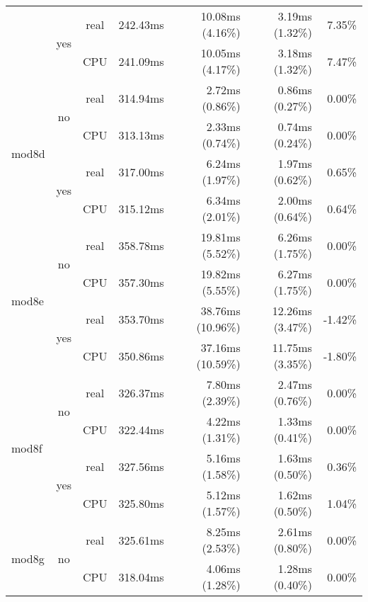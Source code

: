 \documentclass[en]{pracamgr}
\begin{document}
\begin{appendices}
\begin{small}
\begin{longtable}{|l|c|c|r|r|r|r|}
                          \cline{2-7}
                          & \multirow{2}{*}{yes} & real & 242.43ms & 10.08ms (4.16\%) & 3.19ms (1.32\%) & 7.35\% \\*
                          &                      & CPU  & 241.09ms & 10.05ms (4.17\%) & 3.18ms (1.32\%) & 7.47\% \\
\hline
\multirow{4}{*}{mod8d}    & \multirow{2}{*}{no}  & real & 314.94ms & 2.72ms (0.86\%) & 0.86ms (0.27\%) & 0.00\% \\*
                          &                      & CPU  & 313.13ms & 2.33ms (0.74\%) & 0.74ms (0.24\%) & 0.00\% \\*
                          \cline{2-7}
                          & \multirow{2}{*}{yes} & real & 317.00ms & 6.24ms (1.97\%) & 1.97ms (0.62\%) & 0.65\% \\*
                          &                      & CPU  & 315.12ms & 6.34ms (2.01\%) & 2.00ms (0.64\%) & 0.64\% \\
\hline
\multirow{4}{*}{mod8e}    & \multirow{2}{*}{no}  & real & 358.78ms & 19.81ms (5.52\%) & 6.26ms (1.75\%) & 0.00\% \\*
                          &                      & CPU  & 357.30ms & 19.82ms (5.55\%) & 6.27ms (1.75\%) & 0.00\% \\*
                          \cline{2-7}
                          & \multirow{2}{*}{yes} & real & 353.70ms & 38.76ms (10.96\%) & 12.26ms (3.47\%) & -1.42\% \\*
                          &                      & CPU  & 350.86ms & 37.16ms (10.59\%) & 11.75ms (3.35\%) & -1.80\% \\
\hline
\multirow{4}{*}{mod8f}    & \multirow{2}{*}{no}  & real & 326.37ms & 7.80ms (2.39\%) & 2.47ms (0.76\%) & 0.00\% \\*
                          &                      & CPU  & 322.44ms & 4.22ms (1.31\%) & 1.33ms (0.41\%) & 0.00\% \\*
                          \cline{2-7}
                          & \multirow{2}{*}{yes} & real & 327.56ms & 5.16ms (1.58\%) & 1.63ms (0.50\%) & 0.36\% \\*
                          &                      & CPU  & 325.80ms & 5.12ms (1.57\%) & 1.62ms (0.50\%) & 1.04\% \\
\hline
\multirow{4}{*}{mod8g}    & \multirow{2}{*}{no}  & real & 325.61ms & 8.25ms (2.53\%) & 2.61ms (0.80\%) & 0.00\% \\*
                          &                      & CPU  & 318.04ms & 4.06ms (1.28\%) & 1.28ms (0.40\%) & 0.00\% \\*

\end{longtable}
\end{small}
\end{appendices}
\end{document}
